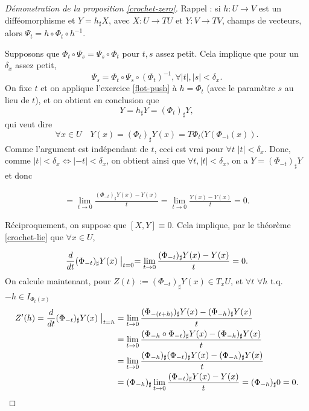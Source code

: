 \documentclass[french]{article}
\theoremstyle{definition}
\newcommand{\lesss}{<}
\newcommand{\less}{\lesss}
\begin{document}
\begin{proof}[Démonstration de la proposition \ref{crochet-zero}]
  Rappel : si \(h : U \longrightarrow V\) est un difféomorphisme et \(Y = h _{\sharp}X\), avec \(X : U \longrightarrow T U\) et \(Y : V \longrightarrow T V\), champs de vecteurs, alors \(\Psi_t = h \circ \Phi_t \circ h ^{-1}\).

 Supposons que \(\Phi_t \circ \Psi_s = \Psi_s \circ \Phi_t\) pour $t,s$ assez petit.  Cela implique que pour un $\delta_x$ assez petit, \[\Psi_s = \Phi_t \circ \Psi_{s} \circ (\Phi_t)^{-1}, \forall \left\lvert t \right\rvert, |s| \less \delta_x.\]  On fixe $t$ et on applique l'exercice \ref{flot-push} à \(h = \Phi_t\) (avec le param\`etre $s$ au lieu de $t$), et on obtient en conclusion que \[Y = h_\sharp Y = (\Phi_t)_{\sharp}Y,\]  qui veut dire
 \[
\forall x\in U \quad Y(x) = (\Phi_t)_\sharp Y (x) =  T\Phi_{t} (Y(\Phi_{-t}(x)).
\]
Comme l'argument est ind\'ependant  de $t$, ceci est vrai pour \( \forall t\,\, \left\lvert t \right\rvert \less \delta_x\). Donc, comme \(\left\lvert t \right\rvert \less \delta_x \iff \left\lvert -t \right\rvert \less \delta_x\), on obtient ainsi que \(\forall t, \left\lvert t \right\rvert \less \delta_x\), on a
  \(Y = (\Phi _{-t})_{\sharp}Y\) et donc

  \begin{gather*}
    [X,Y] = \lim_{t \to 0} \frac{(\Phi _{-t})_{\sharp}Y(x)-Y(x)}{t} = \lim_{t \to 0} \frac{Y(x)-Y(x)}{t} =0.
  \end{gather*}

  Réciproquement, on suppose que \([X,Y] \equiv 0\). Cela implique, par le th\'eor\`eme \ref{crochet-lie} que \(\forall x \in U\),

  \[\frac{d}{dt} (\Phi_{-t})_{\sharp}Y(x)\bigm|_{t=0} =  \lim_{t \to 0} \frac{(\Phi_{-t})_{\sharp}Y(x)-Y(x)}{t} =0. \]
On calcule maintenant, pour $Z(t):=  (\Phi_{-t})_{\sharp}Y(x) \in T_xU$, et \(\forall t\,\, \forall h\) t.q. \(-h \in I_{\Phi_t(x)}\)
\[
\begin{aligned}
 Z'(h)= \frac{d}{dt} (\Phi_{-t})_{\sharp}Y(x)\bigm|_{t=h}
& =  \lim_{t \to 0} \frac{(\Phi_{-(t+h)})_{\sharp}Y(x)-(\Phi_{-h})_{\sharp}Y(x)}{t}
\\ &   =  \lim_{t \to 0} \frac{(\Phi_{-h} \circ \Phi_{-t})_{\sharp}Y(x)-(\Phi_{-h})_{\sharp}Y(x)} {t}
\\ &  =  \lim_{t \to 0} \frac{(\Phi_{-h})_\sharp (\Phi_{-t})_{\sharp}Y(x)-(\Phi_{-h})_{\sharp}Y(x)}{t}
\\ &  =  (\Phi_{-h})_\sharp  \lim_{t \to 0} \frac{(\Phi_{-t})_{\sharp}Y(x)- Y(x)}{t} = (\Phi_{-h})_{\sharp} 0 =0.
 \end{aligned}
\]


\end{proof}
\end{document}
